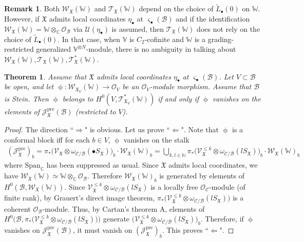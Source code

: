 \documentclass[11pt,b5paper,notitlepage]{article}
\theoremstyle{definition}
\newtheorem{rem}[df]{Remark}
\theoremstyle{plain}
\newtheorem{thm}[df]{Theorem}
\newcommand{\mc}{\mathcal}
\newcommand{\wtd}{\widetilde}
\newcommand{\SV}{\mathscr{V}}
\newcommand{\Span}{\mathrm{Span}}
\newcommand{\scr}{\mathscr}
\newcommand{\sgm}{\varsigma}
\newcommand{\blt}{\bullet}
\newcommand{\Vbb}{\mathbb V}
\newcommand{\Wbb}{\mathbb W}
\newcommand{\Cbb}{\mathbb C}
\newcommand{\Nbb}{\mathbb N}
\newcommand{\<}{\left\langle}
\renewcommand{\>}{\right\rangle}
\newcommand{\MC}{\mathcal{C}}
\newcommand{\MB}{\mathcal{B}}
\newcommand{\fx}{\mathfrak{X}}
\newcommand{\SJ}{\mathscr{J}}
\newcommand{\SW}{\mathscr{W}}
\newcommand{\pre}{\mathrm{pre}}
\numberwithin{equation}{subsection}
\begin{document}
\begin{rem}\label{lbb20}
Both $\scr W_\fx(\Wbb)$ and $\scr T_\fx(\Wbb)$ depend on the choice of $\wtd L_\blt(0)$ on $\Wbb$. However, if $\fx$ admits local coordinates $\eta_\blt$ at $\sgm_\blt(\MB)$ and if the identification $\scr W_\fx(\Wbb)=\Wbb\otimes_\Cbb\mc O_\MB$ via $\mc U(\eta_\blt)$ is assumed, then $\scr T_\fx(\Wbb)$ does not rely on the choice of $\wtd L_\blt(0)$. In that case, when $\Vbb$ is $C_2$-cofinite and $\Wbb$ is a grading-restricted generalized $\Vbb^{\otimes N}$-module, there is no ambiguity in talking about $\scr W_\fx(\Wbb),\scr T_\fx(\Wbb),\scr T^*_\fx(\Wbb)$.
\end{rem}


\begin{thm}\label{lbb28}
Assume that $\fx$ admits local coordinates $\eta_\blt$ at $\sgm_\blt(\MB)$. Let $V\subset\MB$ be open, and let $\upphi:\scr W_{\fx_V}(\Wbb)\rightarrow\mc O_V$ be an $\mc O_V$-module morphism. Assume that $\MB$ is Stein. Then $\upphi$ belongs to $H^0(V,\scr T_{\fx_V}^*(\Wbb))$ if and only if $\upphi$ vanishes on the elements of $\SJ^\pre_\fx(\MB)$ (restricted to $V$).
\end{thm}


\begin{proof}
The direction ``$\Rightarrow$" is obvious. Let us prove ``$\Leftarrow$". Note that $\upphi$ is a conformal block iff for each $b\in V$, $\upphi$ vanishes on the stalk
\begin{align*}
(\SJ^\pre_\fx)_b= \pi_*\big(\SV_{\fx}\otimes \omega_{\MC/\MB}(\blt S_\fx)\big)_b\cdot \SW_\fx(\Wbb)_b=\bigcup_{k,l\in\Nbb}\pi_*\big(\SV_{\fx}^{\leq k}\otimes \omega_{\MC/\MB}(l S_\fx)\big)_b\cdot \SW_\fx(\Wbb)_b
\end{align*}
where $\Span_\Cbb$ has been suppressed as usual. Since $\fx$ admits local coordinates, we have $\scr W_\fx(\Wbb)\simeq\Wbb\otimes_\Cbb\mc O_\MB$. Therefore $\scr W_\fx(\Wbb)_b$ is generated by elements of $H^0(\MB,\scr W_\fx(\Wbb))$. Since $\SV_{\fx}^{\leq k}\otimes \omega_{\MC/\MB}(l S_\fx)$ is a locally free $\mc O_\MC$-module (of finite rank), by Grauert's direct image theorem, $\pi_*\big(\SV_{\fx}^{\leq k}\otimes \omega_{\MC/\MB}(l S_\fx)\big)$ is a coherent $\mc O_\MB$-module. Thus, by Cartan's theorem A, elements of $H^0\big(\MB,\pi_*\big(\SV_{\fx}^{\leq k}\otimes \omega_{\MC/\MB}(l S_\fx)\big)\big)$ generate $\big(\SV_{\fx}^{\leq k}\otimes \omega_{\MC/\MB}(l S_\fx)\big)_b$. Therefore, if $\upphi$ vanishes on $\SJ_\fx^\pre(\MB)$, it must vanish on $(\SJ_\fx^\pre)_b$. This proves ``$\Leftarrow$".
\end{proof}
\end{document}
